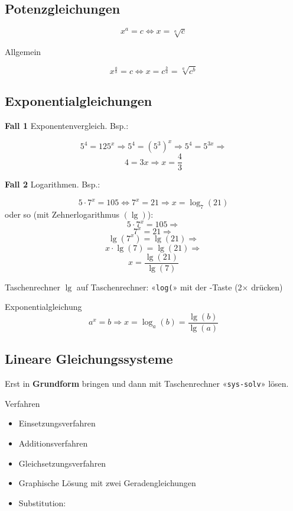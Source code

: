 \begin{multicols}{2}
\hrulefill

\subsection*{Potenzgleichungen}

$$x^a=c \Leftrightarrow x=\sqrt[a]{c}$$

Allgemein

$$x^{\frac{a}b} = c \Leftrightarrow{}
x=c^{\frac{b}a} = \sqrt[a]{c^b}$$

\subsection*{Exponentialgleichungen}
\textbf{Fall 1} Exponentenvergleich. Bsp.:

$$5^4=125^x \Rightarrow{} 5^4=(5^3)^x \Rightarrow{} 5^4=5^{3x} \Rightarrow{}$$
$$ 4=3x \Rightarrow x=\frac43$$

\textbf{Fall 2} Logarithmen. Bsp.:

$$5\cdot{}7^x=105 \Leftrightarrow 7^x=21 \Rightarrow x=\log_7(21)$$
oder so (mit Zehnerlogarithmus $(\lg)$):
$$5\cdot{}7^x=105 \Rightarrow$$
$$7^x=21 \Rightarrow$$
$$ \lg(7^x)=\lg(21) \Rightarrow$$
$$x\cdot{}\lg(7)=\lg(21) \Rightarrow$$
$$ x=\frac{\lg(21)}{\lg(7)}$$

\begin{rezept}{Taschenrechner}{}
$\lg$ auf Taschenrechner: «\texttt{log(}» mit der -Taste (2$\times$ drücken)
\end{rezept}

\begin{gesetz*}{Exponentialgleichung}{}
$$a^x=b \Rightarrow{} x=\log_a(b) = \frac{\lg(b)}{\lg(a)}$$
\end{gesetz*}


\subsection*{Lineare Gleichungssysteme}
Erst in \textbf{Grundform} bringen und dann
mit Taschenrechner «\texttt{sys-solv}»  lösen.

Verfahren
\begin{itemize}
\item Einsetzungsverfahren
\item Additionsverfahren
\item Gleichsetzungsverfahren
\item Graphische Lösung mit zwei Geradengleichungen
\item Substitution:
\end{itemize}


\end{multicols}
